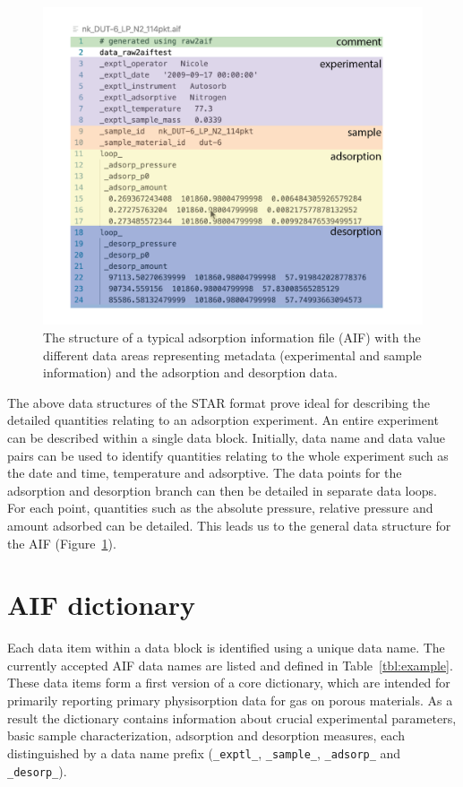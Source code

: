 \documentclass[journal=langd5,manuscript=article]{achemso}
\begin{document}
  
  \begin{figure}[htb]
    \includegraphics{./figures/structure-01.png}
      \caption{The structure of a typical adsorption information file (AIF) with the different data areas representing metadata (experimental and sample information) and the adsorption and desorption data.}
      \label{fgr:datastructure}
    \end{figure}


The above data structures of the STAR format prove ideal for describing the detailed quantities relating to an adsorption experiment.
An entire experiment can be described within a single data block.
Initially, data name and data value pairs can be used to identify quantities relating to the whole experiment such as the date and time, temperature and adsorptive.
The data points for the adsorption and desorption branch can then be detailed in separate data loops.
For each point, quantities such as the absolute pressure, relative pressure and amount adsorbed can be detailed.
This leads us to the general data structure for the AIF (Figure~\ref{fgr:datastructure}).


\section{AIF dictionary}
Each data item within a data block is identified using a unique data name.
The currently accepted AIF data names are listed and defined in Table~\ref{tbl:example}.
These data items form a first version of a core dictionary, which are intended for primarily reporting primary physisorption data for gas on porous materials.
As a result the dictionary contains information about crucial experimental parameters, basic sample characterization, adsorption and desorption measures, each distinguished by a data name prefix (\texttt{\_exptl\_}, \texttt{\_sample\_}, \texttt{\_adsorp\_} and \texttt{\_desorp\_}).
\end{document}
